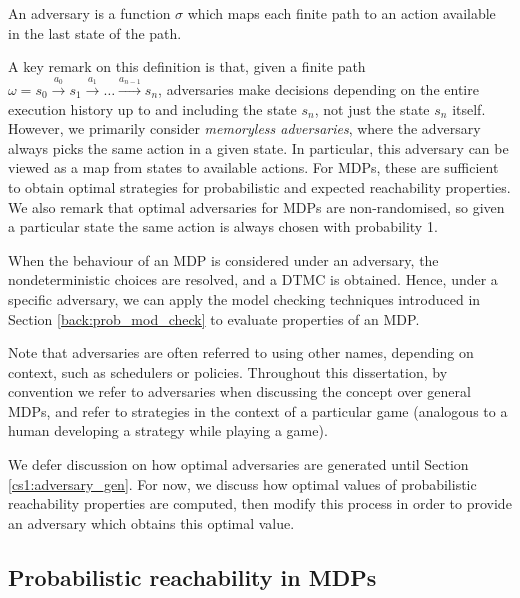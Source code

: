 \begin{definition}
\label{cs1:adversaries}

An adversary is a function $\sigma$ which maps each finite path to an action available in the last state of the path.

\end{definition}
 
A key remark on this definition is that, given a finite path $\omega = s_0 \xrightarrow{a_0} s_1 \xrightarrow{a_1} \dots \xrightarrow{a_{n-1}} s_n$,  adversaries make decisions depending on the entire execution history up to and including the state $s_n$, not just the state $s_n$ itself. However, we primarily consider \emph{memoryless adversaries}, where the adversary always picks the same action in a given state. In particular, this adversary can be viewed as a map from states to available actions. For MDPs, these are sufficient to obtain optimal strategies for probabilistic and expected reachability properties.  We also remark that optimal adversaries for MDPs are non-randomised, so given a particular state the same action is always chosen with probability 1. %

When the behaviour of an MDP is considered under an adversary, the nondeterministic choices are resolved, and a DTMC is obtained. Hence, under a specific adversary, we can apply the model checking techniques introduced in Section \ref{back:prob_mod_check} to evaluate properties of an MDP.

Note that adversaries are often referred to using other names, depending on context, such as schedulers or policies. Throughout this dissertation, by convention we refer to adversaries when discussing the concept over general MDPs, and refer to strategies in the context of a particular game (analogous to a human developing a strategy while playing a game).

We defer discussion on how optimal adversaries are generated until Section \ref{cs1:adversary_gen}. For now, we discuss how optimal values of probabilistic reachability properties are computed, then modify this process in order to provide an adversary which obtains this optimal value.

\subsection{Probabilistic reachability in MDPs}
\label{cs1:prob_reach_mdps}

